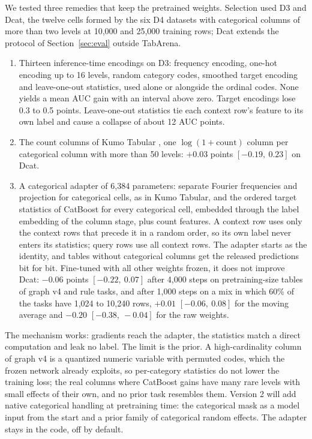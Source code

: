 \documentclass[11pt]{article}
\begin{document}
We tested three remedies that keep the pretrained weights. Selection used D3 and Dcat, the twelve cells
formed by the six D4 datasets with categorical columns of more than two levels at 10,000 and 25,000 training rows;
Dcat extends the protocol of Section~\ref{sec:eval} outside TabArena.
\begin{enumerate}
\item Thirteen inference-time encodings on D3: frequency encoding, one-hot encoding up to 16 levels,
random category codes, smoothed target encoding and leave-one-out statistics, used alone or alongside the
ordinal codes. None yields a mean AUC gain with an interval above zero. Target encodings lose 0.3 to 0.5 points.
Leave-one-out statistics tie each context row's feature to its own label and cause a collapse of about
12 AUC points.
\item The count columns of Kumo Tabular \cite{kumo}, one $\log(1+\mathrm{count})$ column per categorical column
with more than 50 levels: $+0.03$ points $[-0.19,\ 0.23]$ on Dcat.
\item A categorical adapter of 6,384 parameters: separate Fourier frequencies and projection for categorical
cells, as in Kumo Tabular, and the ordered target statistics of CatBoost \cite{prokhorenkova2018} for every
categorical cell, embedded through the label embedding of the column stage, plus count features. A context row
uses only the context rows that precede it in a random order, so its own label never enters its statistics;
query rows use all context rows. The adapter starts as the identity, and tables without categorical columns get
the released predictions bit for bit. Fine-tuned with all other weights frozen, it does not improve Dcat:
$-0.06$ points $[-0.22,\ 0.07]$ after 4,000 steps on pretraining-size tables of graph v4 and rule tasks, and
after 1,000 steps on a mix in which 60\% of the tasks have 1,024 to 10,240 rows, $+0.01$ $[-0.06,\ 0.08]$ for the
moving average and $-0.20$ $[-0.38,\ -0.04]$ for the raw weights.
\end{enumerate}
The mechanism works: gradients reach the adapter, the statistics match a direct computation and leak no label.
The limit is the prior. A high-cardinality column of graph v4 is a quantized numeric variable with permuted codes,
which the frozen network already exploits, so per-category statistics do not lower the training loss; the real
columns where CatBoost gains have many rare levels with small effects of their own, and no prior task resembles
them. Version 2 will add native categorical handling at pretraining time: the categorical mask as a model input
from the start and a prior family of categorical random effects. The adapter stays in the code, off by default.
\end{document}
